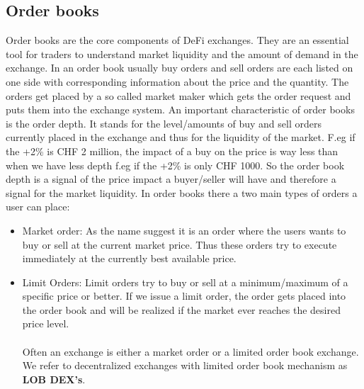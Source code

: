 \documentclass{article}
\begin{document}
\subsection{Order books}
Order books are the core components of DeFi exchanges. They are an essential tool for traders to understand market liquidity and the amount of demand in the exchange. In an order book usually buy orders and sell orders are each listed on one side with corresponding information about the price and the quantity. The orders get placed by a so called market maker which gets the order request and puts them into the exchange system. An important characteristic of order books is the order depth. It stands for the level/amounts of buy and sell orders currently placed in the exchange and thus for the liquidity of the market. F.eg if the +2\% is CHF 2 million, the impact of a buy on the price is way less than when we have less depth f.eg if  the +2\% is only CHF 1000. So the order book depth is a signal of the price impact a buyer/seller will have and therefore a signal for the market liquidity. In order books there a two main types of orders a user can place:
\begin{itemize}
    \item {Market order}: As the name suggest it is an order where the users wants to buy or sell at the current market price. Thus these orders try to execute immediately at the currently best available price.
    \item {Limit Orders}: Limit orders try to buy or sell at a minimum/maximum of a specific price or better. If we issue a limit order, the order gets placed into the order book and will be realized if the market ever reaches the desired price level.\\
    \\
    Often an exchange is either a market order or a limited order book exchange. We refer to decentralized exchanges with limited order book mechanism as \textbf{LOB DEX's}.
\end{itemize}
\end{document}
